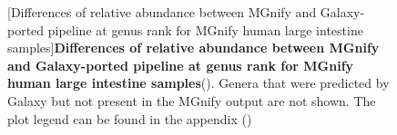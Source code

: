 \begin{figure}[H]
  \centering
  [Differences of relative abundance between MGnify and Galaxy-ported pipeline at genus rank for MGnify human large intestine samples]{\textbf{Differences of relative abundance between MGnify and Galaxy-ported pipeline at genus rank for MGnify human large intestine samples}(). Genera that were predicted by Galaxy but not present in the MGnify output are not shown. The plot legend can be found in the appendix ()} \label{fig:mgnify_human_gut_rel_abundance_g_level}%
\end{figure}

